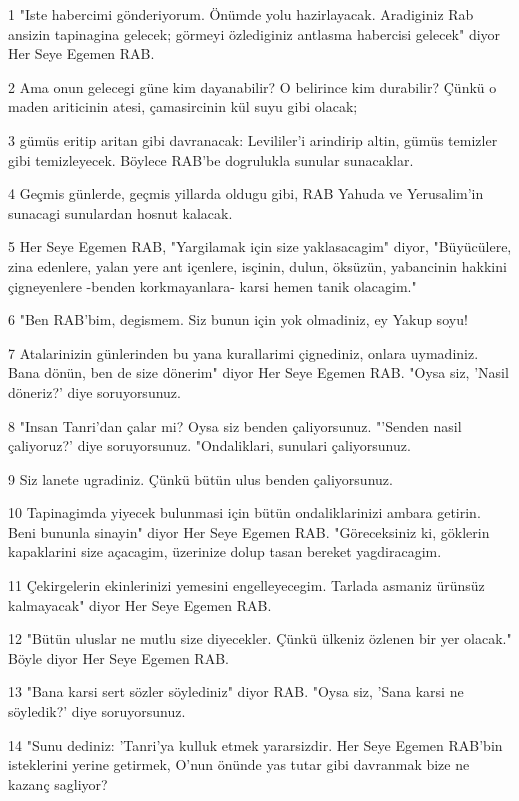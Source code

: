 \par 1 "Iste habercimi gönderiyorum. Önümde yolu hazirlayacak. Aradiginiz Rab ansizin tapinagina gelecek; görmeyi özlediginiz antlasma habercisi gelecek" diyor Her Seye Egemen RAB.
\par 2 Ama onun gelecegi güne kim dayanabilir? O belirince kim durabilir? Çünkü o maden ariticinin atesi, çamasircinin kül suyu gibi olacak;
\par 3 gümüs eritip aritan gibi davranacak: Levililer'i arindirip altin, gümüs temizler gibi temizleyecek. Böylece RAB'be dogrulukla sunular sunacaklar.
\par 4 Geçmis günlerde, geçmis yillarda oldugu gibi, RAB Yahuda ve Yerusalim'in sunacagi sunulardan hosnut kalacak.
\par 5 Her Seye Egemen RAB, "Yargilamak için size yaklasacagim" diyor, "Büyücülere, zina edenlere, yalan yere ant içenlere, isçinin, dulun, öksüzün, yabancinin hakkini çigneyenlere -benden korkmayanlara- karsi hemen tanik olacagim."
\par 6 "Ben RAB'bim, degismem. Siz bunun için yok olmadiniz, ey Yakup soyu!
\par 7 Atalarinizin günlerinden bu yana kurallarimi çignediniz, onlara uymadiniz. Bana dönün, ben de size dönerim" diyor Her Seye Egemen RAB. "Oysa siz, 'Nasil döneriz?' diye soruyorsunuz.
\par 8 "Insan Tanri'dan çalar mi? Oysa siz benden çaliyorsunuz. "'Senden nasil çaliyoruz?' diye soruyorsunuz. "Ondaliklari, sunulari çaliyorsunuz.
\par 9 Siz lanete ugradiniz. Çünkü bütün ulus benden çaliyorsunuz.
\par 10 Tapinagimda yiyecek bulunmasi için bütün ondaliklarinizi ambara getirin. Beni bununla sinayin" diyor Her Seye Egemen RAB. "Göreceksiniz ki, göklerin kapaklarini size açacagim, üzerinize dolup tasan bereket yagdiracagim.
\par 11 Çekirgelerin ekinlerinizi yemesini engelleyecegim. Tarlada asmaniz ürünsüz kalmayacak" diyor Her Seye Egemen RAB.
\par 12 "Bütün uluslar ne mutlu size diyecekler. Çünkü ülkeniz özlenen bir yer olacak." Böyle diyor Her Seye Egemen RAB.
\par 13 "Bana karsi sert sözler söylediniz" diyor RAB. "Oysa siz, 'Sana karsi ne söyledik?' diye soruyorsunuz.
\par 14 "Sunu dediniz: 'Tanri'ya kulluk etmek yararsizdir. Her Seye Egemen RAB'bin isteklerini yerine getirmek, O'nun önünde yas tutar gibi davranmak bize ne kazanç sagliyor?
